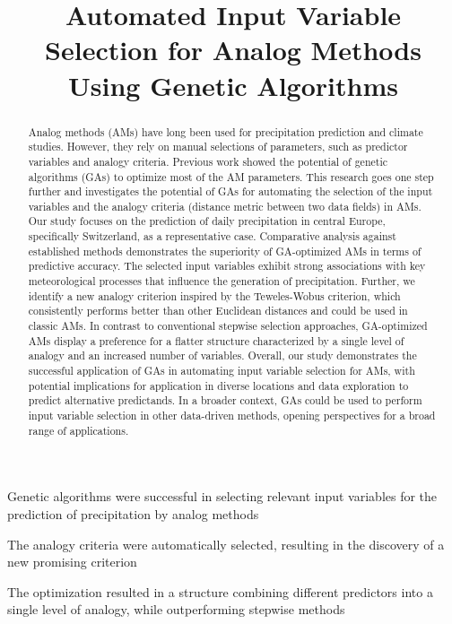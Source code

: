 \documentclass[draft]{agujournal2019}
\begin{document}
\title{Automated Input Variable Selection for Analog Methods Using Genetic Algorithms}





\begin{keypoints}
\item Genetic algorithms were successful in selecting relevant input variables for the prediction of precipitation by analog methods
\item The analogy criteria were automatically selected, resulting in the discovery of a new promising criterion
\item The optimization resulted in a structure combining different predictors into a single level of analogy, while outperforming stepwise methods
\end{keypoints}


\begin{abstract}

Analog methods (AMs) have long been used for precipitation prediction and climate studies. However, they rely on manual selections of parameters, such as predictor variables and analogy criteria. Previous work showed the potential of genetic algorithms (GAs) to optimize most of the AM parameters. This research goes one step further and investigates the potential of GAs for automating the selection of the input variables and the analogy criteria (distance metric between two data fields) in AMs. Our study focuses on the prediction of daily precipitation in central Europe, specifically Switzerland, as a representative case.  
Comparative analysis against established methods demonstrates the superiority of GA-optimized AMs in terms of predictive accuracy. The selected input variables exhibit strong associations with key meteorological processes that influence the generation of precipitation. Further, we identify a new analogy criterion inspired by the Teweles-Wobus criterion, which consistently performs better than other Euclidean distances and could be used in classic AMs. In contrast to conventional stepwise selection approaches, GA-optimized AMs display a preference for a flatter structure characterized by a single level of analogy and an increased number of variables.
Overall, our study demonstrates the successful application of GAs in automating input variable selection for AMs, with potential implications for application in diverse locations and data exploration to predict alternative predictands. In a broader context, GAs could be used to perform input variable selection in other data-driven methods, opening perspectives for a broad range of applications.


\end{abstract}
\end{document}
